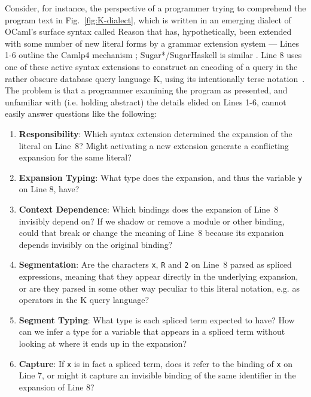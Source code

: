 \documentclass[acmsmall]{acmart}
\newcommand{\li}[1]{\lstinline[basicstyle=\ttfamily\fontsize{9pt}{1em}\selectfont]{#1}}
\begin{document}
Consider, for instance, the perspective of a programmer trying to comprehend the program text in Fig.~\ref{fig:K-dialect}, which is written in an emerging dialect of OCaml's surface syntax called Reason \cite{reason-what} that has, hypothetically, been extended with some number of new literal forms by a grammar extension system --- Lines 1-6 outline the Camlp4 mechanism \cite{de2003camlp4}; Sugar*/SugarHaskell is similar \cite{erdweg2011sugarj,erdweg2012layout}. 
Line 8 uses one of these active syntax extensions to construct an encoding of a query in the rather obscure database query language K, using its intentionally terse notation~\cite{Whitney:2001:LOR:376284.375783}. The problem is that a programmer examining the program as presented, and unfamiliar with (i.e. holding abstract) the details elided on Lines 1-6, cannot easily answer questions like the following:

\begin{enumerate}[leftmargin=15px]
\item \textbf{Responsibility}: Which syntax extension determined the expansion of the literal on Line~8? Might activating a new extension generate a conflicting expansion for the same literal?
\item \textbf{Expansion Typing}: What type does the expansion, and thus the variable \li{y} on Line 8, have?
\item \textbf{Context Dependence}: Which bindings does the expansion of Line~8 invisibly depend on? If we shadow or remove a module or other binding, could that break or change the meaning of Line~8 because its expansion depends invisibly on the original binding?
\item \textbf{Segmentation}: Are the characters \li{x}, \li{R} and \li{2} on Line~8 parsed as spliced expressions, meaning that they appear directly in the underlying expansion, or are they parsed in some other way peculiar to this literal notation, e.g. as operators in the K query language?
\item \textbf{Segment Typing}: What type is each spliced term expected to have? How can we infer a type for a variable that appears in a spliced term without looking at where it ends up in the expansion?
\item \textbf{Capture}: If \li{x} is in fact a spliced term, does it refer to the binding of \li{x} on Line 7, or might it capture an invisible binding of the same identifier in the expansion of Line 8?
\end{enumerate}
\end{document}
